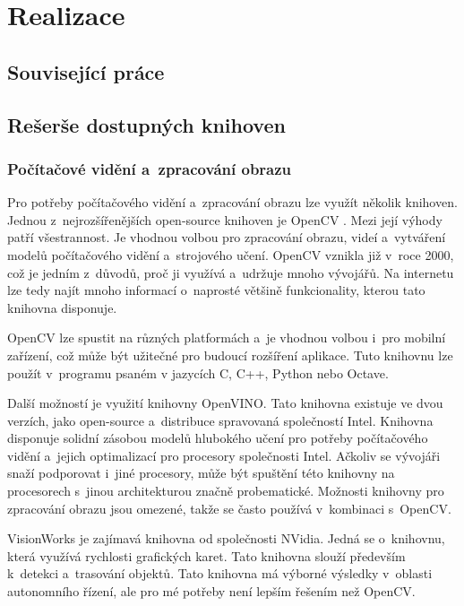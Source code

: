 \chapter{Realizace}

\section{Související práce}

\section{Rešerše dostupných knihoven}

\subsection{Počítačové vidění a~zpracování obrazu}

Pro potřeby počítačového vidění a~zpracování obrazu lze využít několik knihoven. Jednou z~nejrozšířenějších open-source knihoven je OpenCV \citep{OpenCV}. Mezi její výhody patří všestrannost. Je vhodnou volbou pro zpracování obrazu, videí a~vytváření modelů počítačového vidění a~strojového učení. OpenCV vznikla již v~roce 2000, což je jedním z~důvodů, proč ji využívá a~udržuje mnoho vývojářů. Na internetu lze tedy najít mnoho informací o~naprosté většině funkcionality, kterou tato knihovna disponuje.

OpenCV lze spustit na různých platformách a~je vhodnou volbou i~pro mobilní zařízení, což může být užitečné pro budoucí rozšíření aplikace. Tuto knihovnu lze použít v~programu psaném v jazycích C, C++, Python nebo Octave.

Další možností je využití knihovny OpenVINO. Tato knihovna existuje ve dvou verzích, jako open-source a~distribuce spravovaná společností Intel. Knihovna disponuje solidní zásobou modelů hlubokého učení pro potřeby počítačového vidění a~jejich optimalizací pro procesory společnosti Intel. Ačkoliv se vývojáři snaží podporovat i~jiné procesory, může být spuštění této knihovny na procesorech s~jinou architekturou značně probematické. Možnosti knihovny pro zpracování obrazu jsou omezené, takže se často používá v~kombinaci s~OpenCV.

VisionWorks je zajímavá knihovna od společnosti NVidia. Jedná se o~knihovnu, která využívá rychlosti grafických karet. Tato knihovna slouží především k~detekci a~trasování objektů. Tato knihovna má výborné výsledky v~oblasti autonomního řízení, ale pro mé potřeby není lepším řešením než OpenCV.

